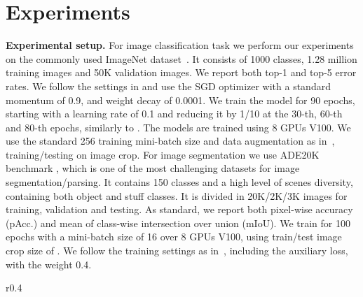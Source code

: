 \documentclass{article}
\begin{document}
\section{Experiments \label{sec:exp}}
{\bf Experimental setup.}  For image classification task we perform our experiments on the commonly used ImageNet  dataset~\cite{russakovsky2015imagenet}. It consists of 1000 classes, 1.28 million training images and 50K  validation images. We report both top-1 and top-5 error rates. We follow the settings in \cite{goyal2017accurate,he2016deep,he2016identity} and use the SGD optimizer with a standard momentum of 0.9, and weight decay of 0.0001.  We train the model for 90 epochs, starting with a learning rate of 0.1 and reducing it by 1/10 at the 30-th, 60-th and 80-th epochs, similarly to \cite{he2016deep,goyal2017accurate}. The models are trained using 8 GPUs V100. We use the standard 256 training mini-batch size and data augmentation as in~\cite{szegedy2015going,goyal2017accurate}, training/testing on  image crop.
For image segmentation we use ADE20K benchmark \cite{zhou2019semantic}, which is one of the most challenging datasets for image segmentation/parsing. It contains 150 classes and a high level of scenes diversity, containing both object and stuff classes. It is divided in 20K/2K/3K images for training, validation and testing.
As standard, we report both pixel-wise accuracy (pAcc.) and mean of class-wise intersection over union (mIoU). We train for 100 epochs with a mini-batch size of 16 over 8 GPUs V100, using train/test image crop size of . We follow the training settings as  in~\cite{zhao2017pyramid}, including the auxiliary loss, with the weight 0.4. 



\addtolength{\tabcolsep}{-5pt}
\renewcommand{\arraystretch}{1.}
\begin{wraptable}{r}{0.4\textwidth}
\vspace{-0.2in}
\centering
\caption{ImageNet ablation experiments of PyConvResNet.}
\label{table:ablation_exp}
\vspace{-0.2in}
\end{wraptable}
\addtolength{\tabcolsep}{5pt}
\end{document}
